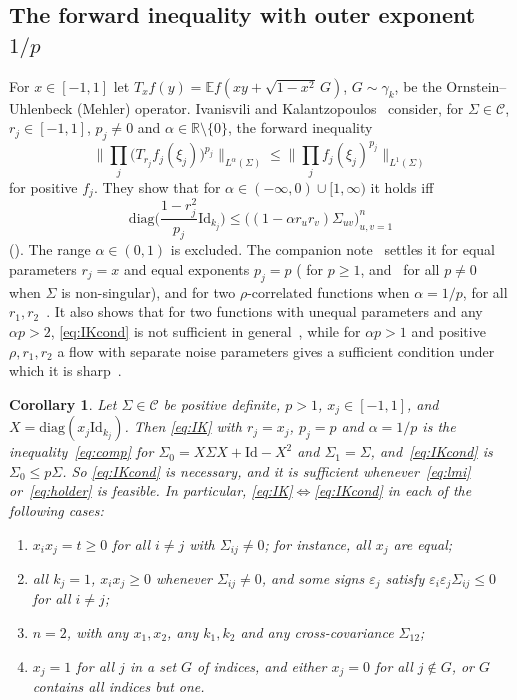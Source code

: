 \documentclass[11pt]{amsart}
\newtheorem{corollary}[theorem]{Corollary}
\theoremstyle{definition}
\newcommand{\E}{\mathbb{E}}
\newcommand{\R}{\mathbb{R}}
\newcommand{\Id}{\mathrm{Id}}
\begin{document}
\subsection{The forward inequality with outer exponent \texorpdfstring{$1/p$}{1/p}}
For $x\in[-1,1]$ let $T_xf(y)=\E f(xy+\sqrt{1-x^2}\,G)$, $G\sim\gamma_k$, be the Ornstein--Uhlenbeck (Mehler)
operator. Ivanisvili and Kalantzopoulos~\cite[Thm.~9]{IK25} consider, for $\Sigma\in\mathcal C$, $r_j\in[-1,1]$, $p_j\ne0$
and $\alpha\in\R\setminus\{0\}$, the forward inequality
\begin{equation}\label{eq:IK}
\Big\|\prod_j\big(T_{r_j}f_j(\xi_j)\big)^{p_j}\Big\|_{L^\alpha(\Sigma)}\le\Big\|\prod_jf_j(\xi_j)^{p_j}\Big\|_{L^1(\Sigma)}
\end{equation}
for positive $f_j$. They show that for $\alpha\in(-\infty,0)\cup[1,\infty)$ it holds iff
\begin{equation}\label{eq:IKcond}
\mathrm{diag}\Big(\frac{1-r_j^2}{p_j}\Id_{k_j}\Big)\le\big((1-\alpha r_ur_v)\Sigma_{uv}\big)_{u,v=1}^n
\end{equation}
(\cite[(2.16), (2.17)]{IK25}). The range $\alpha\in(0,1)$ is excluded. The companion note~\cite{FR} settles it for
equal parameters $r_j=x$ and equal exponents $p_j=p$ (\cite[Thm.~1.1]{FR} for $p\ge1$, and~\cite[Cor.~1.4]{FR} for all
$p\ne0$ when $\Sigma$ is non-singular), and for two $\rho$-correlated functions when $\alpha=1/p$, for all
$r_1,r_2$~\cite[Prop.~6.1]{FR}. It also shows that for two functions with unequal parameters and any $\alpha p>2$,
\eqref{eq:IKcond} is not sufficient in general~\cite[Props.~6.3, 6.5]{FR}, while for $\alpha p>1$ and positive
$\rho,r_1,r_2$ a flow with separate noise parameters gives a sufficient condition under which it is
sharp~\cite[Thm.~6.9]{FR}.

\begin{corollary}\label{cor:IK}
Let $\Sigma\in\mathcal C$ be positive definite, $p>1$, $x_j\in[-1,1]$, and $X=\mathrm{diag}(x_j\Id_{k_j})$. Then
\eqref{eq:IK} with $r_j=x_j$, $p_j=p$ and $\alpha=1/p$ is the inequality~\eqref{eq:comp} for
$\Sigma_0=X\Sigma X+\Id-X^2$ and $\Sigma_1=\Sigma$, and~\eqref{eq:IKcond} is $\Sigma_0\le p\Sigma$. So
\eqref{eq:IKcond} is necessary, and it is sufficient whenever~\eqref{eq:lmi} or~\eqref{eq:holder} is feasible. In
particular, \eqref{eq:IK}$\Leftrightarrow$\eqref{eq:IKcond} in each of the following cases:
\begin{enumerate}[label=(\roman*)]
\item $x_ix_j=t\ge0$ for all $i\ne j$ with $\Sigma_{ij}\ne0$; for instance, all $x_j$ are equal;
\item all $k_j=1$, $x_ix_j\ge0$ whenever $\Sigma_{ij}\ne0$, and some signs $\varepsilon_j$ satisfy
$\varepsilon_i\varepsilon_j\Sigma_{ij}\le0$ for all $i\ne j$;
\item $n=2$, with any $x_1,x_2$, any $k_1,k_2$ and any cross-covariance $\Sigma_{12}$;
\item $x_j=1$ for all $j$ in a set $G$ of indices, and either $x_j=0$ for all $j\notin G$, or $G$ contains all
indices but one.
\end{enumerate}
\end{corollary}
\end{document}
